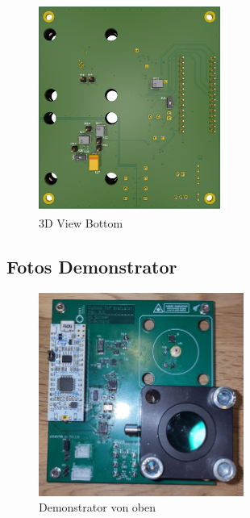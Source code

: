 \begin{figure}[H]
    \centering
    \includegraphics[width=0.55\textwidth]{graphics/3d_bottom.png}
    \caption{3D View Bottom}\label{fig:apdx_3d_bottom}
\end{figure}

\subsection{Fotos Demonstrator}\label{sec:apdx_photos_demonstrator}

\begin{figure}[H]
    \centering
    \includegraphics[width=0.6\textwidth]{graphics/photo_demonstrator_top.jpg}
    \caption{Demonstrator von oben}\label{fig:apdx_photo_demonstrator_top}
\end{figure}

